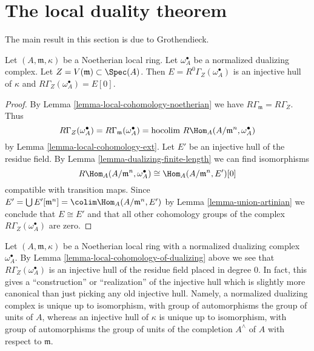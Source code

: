 \section{The local duality theorem}
\label{section-local-duality}

\noindent
The main result in this section is due to Grothendieck.

\begin{lemma}
\label{lemma-local-cohomology-of-dualizing}
Let $(A, \mathfrak m, \kappa)$ be a Noetherian local ring.
Let $\omega_A^\bullet$ be a normalized dualizing complex.
Let $Z = V(\mathfrak m) \subset \Spec(A)$.
Then $E = R^0\Gamma_Z(\omega_A^\bullet)$ is an injective hull of
$\kappa$ and $R\Gamma_Z(\omega_A^\bullet) = E[0]$.
\end{lemma}

\begin{proof}
By Lemma \ref{lemma-local-cohomology-noetherian} we have
$R\Gamma_{\mathfrak m} = R\Gamma_Z$. Thus
$$
R\Gamma_Z(\omega_A^\bullet) =
R\Gamma_{\mathfrak m}(\omega_A^\bullet) =
\text{hocolim}\ R\Hom_A(A/\mathfrak m^n, \omega_A^\bullet)
$$
by Lemma \ref{lemma-local-cohomology-ext}. Let $E'$ be an injective
hull of the residue field.
By Lemma \ref{lemma-dualizing-finite-length}
we can find isomorphisms
$$
R\Hom_A(A/\mathfrak m^n, \omega_A^\bullet) \cong \Hom_A(A/\mathfrak m^n, E')[0]
$$
compatible with transition maps. Since
$E' = \bigcup E'[\mathfrak m^n] = \colim \Hom_A(A/\mathfrak m^n, E')$
by Lemma \ref{lemma-union-artinian}
we conclude that $E \cong E'$ and that all other cohomology
groups of the complex $R\Gamma_Z(\omega_A^\bullet)$ are zero.
\end{proof}

\begin{remark}
\label{remark-specific-injective-hull}
Let $(A, \mathfrak m, \kappa)$ be a Noetherian local ring
with a normalized dualizing complex $\omega_A^\bullet$.
By Lemma \ref{lemma-local-cohomology-of-dualizing}
above we see that $R\Gamma_Z(\omega_A^\bullet)$
is an injective hull of the residue field placed in degree $0$.
In fact, this gives a ``construction'' or ``realization''
of the injective hull which is slightly more canonical than
just picking any old injective hull. Namely, a normalized
dualizing complex is unique up to isomorphism, with group
of automorphisms the group of units of $A$, whereas an
injective hull of $\kappa$ is unique up to isomorphism, with
group of automorphisms the group of units of the completion
$A^\wedge$ of $A$ with respect to $\mathfrak m$.
\end{remark}

